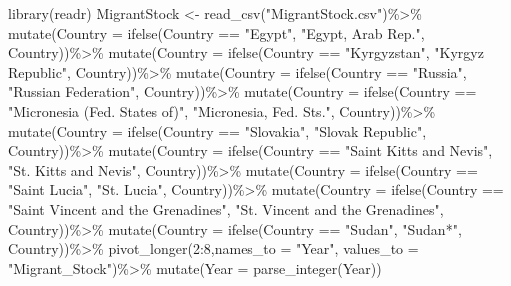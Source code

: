 \documentclass[
]{article}
\newenvironment{Shaded}{\begin{snugshade}}{\end{snugshade}}
\newcommand{\AttributeTok}[1]{\textcolor[rgb]{0.77,0.63,0.00}{#1}}
\newcommand{\DecValTok}[1]{\textcolor[rgb]{0.00,0.00,0.81}{#1}}
\newcommand{\FunctionTok}[1]{\textcolor[rgb]{0.00,0.00,0.00}{#1}}
\newcommand{\NormalTok}[1]{#1}
\newcommand{\OtherTok}[1]{\textcolor[rgb]{0.56,0.35,0.01}{#1}}
\newcommand{\SpecialCharTok}[1]{\textcolor[rgb]{0.00,0.00,0.00}{#1}}
\newcommand{\StringTok}[1]{\textcolor[rgb]{0.31,0.60,0.02}{#1}}
\begin{document}
\begin{Shaded}
\begin{Highlighting}[]
\FunctionTok{library}\NormalTok{(readr)}
\NormalTok{MigrantStock }\OtherTok{\textless{}{-}} \FunctionTok{read\_csv}\NormalTok{(}\StringTok{"MigrantStock.csv"}\NormalTok{)}\SpecialCharTok{\%\textgreater{}\%}
  \FunctionTok{mutate}\NormalTok{(}\AttributeTok{Country =} \FunctionTok{ifelse}\NormalTok{(Country }\SpecialCharTok{==} \StringTok{"Egypt"}\NormalTok{, }\StringTok{"Egypt, Arab Rep."}\NormalTok{, Country))}\SpecialCharTok{\%\textgreater{}\%}
  \FunctionTok{mutate}\NormalTok{(}\AttributeTok{Country =} \FunctionTok{ifelse}\NormalTok{(Country }\SpecialCharTok{==} \StringTok{"Kyrgyzstan"}\NormalTok{, }\StringTok{"Kyrgyz Republic"}\NormalTok{, Country))}\SpecialCharTok{\%\textgreater{}\%}
  \FunctionTok{mutate}\NormalTok{(}\AttributeTok{Country =} \FunctionTok{ifelse}\NormalTok{(Country }\SpecialCharTok{==} \StringTok{"Russia"}\NormalTok{, }\StringTok{"Russian Federation"}\NormalTok{, Country))}\SpecialCharTok{\%\textgreater{}\%}
  \FunctionTok{mutate}\NormalTok{(}\AttributeTok{Country =} \FunctionTok{ifelse}\NormalTok{(Country }\SpecialCharTok{==} \StringTok{"Micronesia (Fed. States of)"}\NormalTok{, }\StringTok{"Micronesia, Fed. Sts."}\NormalTok{, Country))}\SpecialCharTok{\%\textgreater{}\%}
  \FunctionTok{mutate}\NormalTok{(}\AttributeTok{Country =} \FunctionTok{ifelse}\NormalTok{(Country }\SpecialCharTok{==} \StringTok{"Slovakia"}\NormalTok{, }\StringTok{"Slovak Republic"}\NormalTok{, Country))}\SpecialCharTok{\%\textgreater{}\%}
    \FunctionTok{mutate}\NormalTok{(}\AttributeTok{Country =} \FunctionTok{ifelse}\NormalTok{(Country }\SpecialCharTok{==} \StringTok{"Saint Kitts and Nevis"}\NormalTok{, }\StringTok{"St. Kitts and Nevis"}\NormalTok{, Country))}\SpecialCharTok{\%\textgreater{}\%}
    \FunctionTok{mutate}\NormalTok{(}\AttributeTok{Country =} \FunctionTok{ifelse}\NormalTok{(Country }\SpecialCharTok{==} \StringTok{"Saint Lucia"}\NormalTok{, }\StringTok{"St. Lucia"}\NormalTok{, Country))}\SpecialCharTok{\%\textgreater{}\%}
  \FunctionTok{mutate}\NormalTok{(}\AttributeTok{Country =} \FunctionTok{ifelse}\NormalTok{(Country }\SpecialCharTok{==} \StringTok{"Saint Vincent and the Grenadines"}\NormalTok{, }\StringTok{"St. Vincent and the Grenadines"}\NormalTok{, Country))}\SpecialCharTok{\%\textgreater{}\%}
  \FunctionTok{mutate}\NormalTok{(}\AttributeTok{Country =} \FunctionTok{ifelse}\NormalTok{(Country }\SpecialCharTok{==} \StringTok{"Sudan"}\NormalTok{, }\StringTok{"Sudan*"}\NormalTok{, Country))}\SpecialCharTok{\%\textgreater{}\%}
  \FunctionTok{pivot\_longer}\NormalTok{(}\DecValTok{2}\SpecialCharTok{:}\DecValTok{8}\NormalTok{,}\AttributeTok{names\_to =} \StringTok{"Year"}\NormalTok{, }\AttributeTok{values\_to =} \StringTok{"Migrant\_Stock"}\NormalTok{)}\SpecialCharTok{\%\textgreater{}\%}
  \FunctionTok{mutate}\NormalTok{(}\AttributeTok{Year =} \FunctionTok{parse\_integer}\NormalTok{(Year))}
\end{Highlighting}
\end{Shaded}
\end{document}
